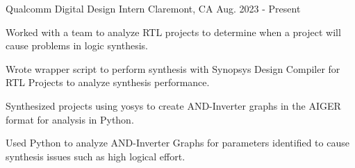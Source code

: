   \cventry
    {Qualcomm} %
    {Digital Design Intern} %
    {Claremont, CA} %
    {Aug. 2023 - Present} %
    {
    \begin{cvitems}
      \item{
      Worked with a team to analyze RTL projects to determine when a project will cause problems in logic synthesis.
      }
      \item{
      Wrote wrapper script to perform synthesis with Synopsys Design Compiler for RTL Projects to analyze synthesis performance.
      }
      \item{
      Synthesized projects using yosys to create AND-Inverter graphs in the AIGER format for analysis in Python.
      }
      \item{
      Used Python to analyze AND-Inverter Graphs for parameters identified to cause synthesis issues such as high logical effort.
      }
    \end{cvitems}
    }
